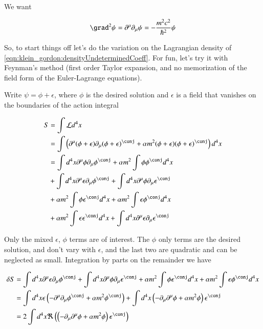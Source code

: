 We want

\begin{align*}
\grad^2 \psi = \partial^\mu \partial_\mu \psi = -\frac{m^2 c^2}{\hbar^2} \psi
\end{align*}


So, to start things off let's do the variation on the Lagrangian density of \ref{eqn:klein_gordon:densityUndeterminedCoeff}.  For fun, let's try it with Feynman's method (first order Taylor expansion, and no memorization
of the field form of the Euler-Lagrange equations).

Write $\psi = \phi + \epsilon$, where $\phi$ is the desired solution and $\epsilon$ is a field that
vanishes on the boundaries of the action integral

\begin{align*}
S
&= \int \LL d^4 x \\
&=
\int \left( \partial^\mu (\phi + \epsilon) \partial_\mu (\phi + \epsilon)^\conj + \alpha m^2 (\phi + \epsilon) (\phi + \epsilon)^\conj \right) d^4 x \\
&=
\int d^4 x \partial^\mu \phi \partial_\mu \phi^\conj
+ \alpha m^2 \int \phi \phi^\conj  d^4 x \\
&+ \int d^4 x \partial^\mu \epsilon \partial_\mu \phi^\conj
+ \int d^4 x \partial^\mu \phi \partial_\mu \epsilon^\conj  \\
&+ \alpha m^2 \int \phi \epsilon^\conj  d^4 x
+ \alpha m^2 \int \epsilon \phi^\conj  d^4 x \\
&+ \alpha m^2 \int \epsilon \epsilon^\conj  d^4 x
+ \int d^4 x \partial^\mu \epsilon \partial_\mu \epsilon^\conj \\
\end{align*}

Only the mixed $\epsilon$, $\phi$ terms are of interest.  The $\phi$ only terms are the desired solution, and don't vary with $\epsilon$, and the last two are
quadratic and can be neglected as small.  Integration by parts on the remainder we have

\begin{align*}
\delta S
&=
\int d^4 x \partial^\mu \epsilon \partial_\mu \phi^\conj
+ \int d^4 x \partial^\mu \phi \partial_\mu \epsilon^\conj
+ \alpha m^2 \int \phi \epsilon^\conj  d^4 x
+ \alpha m^2 \int \epsilon \phi^\conj  d^4 x \\
&=
\int d^4 x \epsilon \left( -\partial^\mu \partial_\mu \phi^\conj + \alpha m^2 \phi^\conj \right)
+ \int d^4 x \left( -\partial_\mu \partial^\mu \phi + \alpha m^2 \phi \right) \epsilon^\conj
\\
&=
2 \int d^4 x \Re \left( \left( -\partial_\mu \partial^\mu \phi + \alpha m^2 \phi \right) \epsilon^\conj  \right) \\
\end{align*}


